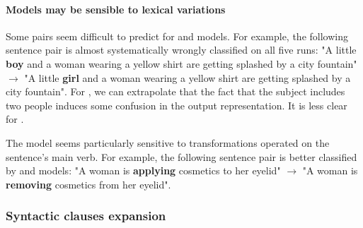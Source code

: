 \paragraph{Models may be sensible to lexical variations}

Some pairs seem difficult to predict for \cls and \bow models. For example, the following sentence pair is almost systematically wrongly classified on all five runs: "A little \textbf{boy} and a woman wearing a yellow shirt are getting splashed by a city fountain" $\rightarrow$ "A little \textbf{girl} and a woman wearing a yellow shirt are getting splashed by a city fountain". For \bow, we can extrapolate that the fact that the subject includes two people induces some confusion in the output representation. It is less clear for \cls.

The \dep model seems particularly sensitive to transformations operated on the sentence's main verb. For example, the following sentence pair is better classified by \dep and \seq models:
"A woman is \textbf{applying} cosmetics to her eyelid" $\rightarrow$ "A woman is \textbf{removing} cosmetics from her eyelid".



\subsubsection{Syntactic clauses expansion}


